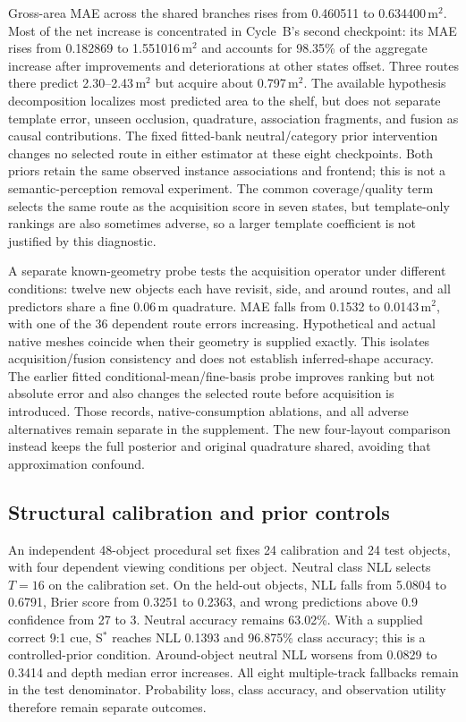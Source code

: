 

Gross-area MAE across the shared branches rises from 0.460511 to 0.634400\,m$^2$. Most of the net increase is concentrated in Cycle~B's second checkpoint: its MAE rises from 0.182869 to 1.551016\,m$^2$ and accounts for 98.35\% of the aggregate increase after improvements and deteriorations at other states offset. Three routes there predict 2.30--2.43\,m$^2$ but acquire about 0.797\,m$^2$. The available hypothesis decomposition localizes most predicted area to the shelf, but does not separate template error, unseen occlusion, quadrature, association fragments, and fusion as causal contributions. The fixed fitted-bank neutral/category prior intervention changes no selected route in either estimator at these eight checkpoints. Both priors retain the same observed instance associations and frontend; this is not a semantic-perception removal experiment. The common coverage/quality term selects the same route as the acquisition score in seven states, but template-only rankings are also sometimes adverse, so a larger template coefficient is not justified by this diagnostic.

A separate known-geometry probe tests the acquisition operator under different conditions: twelve new objects each have revisit, side, and around routes, and all predictors share a fine 0.06\,m quadrature. MAE falls from 0.1532 to 0.0143\,m$^2$, with one of the 36 dependent route errors increasing. Hypothetical and actual native meshes coincide when their geometry is supplied exactly. This isolates acquisition/fusion consistency and does not establish inferred-shape accuracy. The earlier fitted conditional-mean/fine-basis probe improves ranking but not absolute error and also changes the selected route before acquisition is introduced. Those records, native-consumption ablations, and all adverse alternatives remain separate in the supplement. The new four-layout comparison instead keeps the full posterior and original quadrature shared, avoiding that approximation confound.

\subsection{Structural calibration and prior controls}
An independent 48-object procedural set fixes 24 calibration and 24 test objects, with four dependent viewing conditions per object. Neutral class NLL selects $T=16$ on the calibration set. On the held-out objects, NLL falls from 5.0804 to 0.6791, Brier score from 0.3251 to 0.2363, and wrong predictions above 0.9 confidence from 27 to 3. Neutral accuracy remains 63.02\%. With a supplied correct 9:1 cue, S$^*$ reaches NLL 0.1393 and 96.875\% class accuracy; this is a controlled-prior condition. Around-object neutral NLL worsens from 0.0829 to 0.3414 and depth median error increases. All eight multiple-track fallbacks remain in the test denominator. Probability loss, class accuracy, and observation utility therefore remain separate outcomes.

